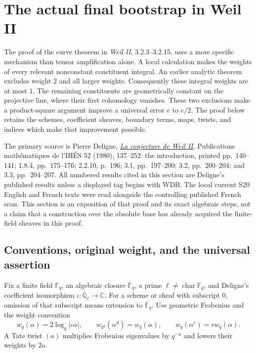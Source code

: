 \section{The actual final bootstrap in Weil II}
\label{CFStage:weil-ii-dyadic-bootstrap}

The proof of the curve theorem in \emph{Weil II}, 3.2.3--3.2.15,
uses a more specific mechanism than tensor amplification alone. A local
calculation makes the weights of every relevant nonconstant constituent
integral. An earlier analytic theorem excludes weight \(2\) and all larger
weights. Consequently these integral weights are at most \(1\). The
remaining constituents are geometrically constant on the projective
line, where their first cohomology vanishes. These two exclusions make a
product-square argument improve a universal error \(e\) to \(e/2\).
The proof below retains the schemes, coefficient sheaves, boundary
terms, maps, twists, and indices which make that improvement possible.

The primary source is Pierre Deligne,
\href{https://www.numdam.org/item/PMIHES_1980__52__137_0/}
{\emph{La conjecture de Weil II}}, Publications math\'ematiques de
l'IH\'ES 52 (1980), 137--252: the introduction, printed pp.~140--141;
1.8.4, pp.~175--176; 2.2.10, p.~196; 3.1, pp.~197--200;
3.2, pp.~200--204; and 3.3, pp.~204--207. All numbered results cited
in this section are Deligne's published results unless a displayed tag
begins with WDB. The local current S20 English and French texts were
read alongside the controlling published French scan. This section is
an exposition of that proof and its exact algebraic steps, not a claim
that a construction over the absolute base has already acquired the
finite-field sheaves in this proof.

\subsection{Conventions, original weight, and the universal assertion}

Fix a finite field \(\mathbb F_q\), an algebraic closure
\(\overline{\mathbb F}_q\), a prime \(\ell\ne\operatorname{char}
\mathbb F_q\), and Deligne's coefficient isomorphism
\(\iota:\overline{\mathbb Q}_\ell\longrightarrow\mathbb C\).
For a scheme or sheaf with subscript \(0\), omission of that subscript
means extension to \(\overline{\mathbb F}_q\). Use geometric
Frobenius and the weight convention
\[
 w_q(\alpha)=2\log_q|\iota\alpha|,
 \qquad w_{q^d}(\alpha^d)=w_q(\alpha),
 \qquad w_q(\alpha^r)=r w_q(\alpha).
 \tag{WDB1}
\]
A Tate twist \((a)\) multiplies Frobenius eigenvalues by
\(q^{-a}\) and lowers their weights by \(2a\).

